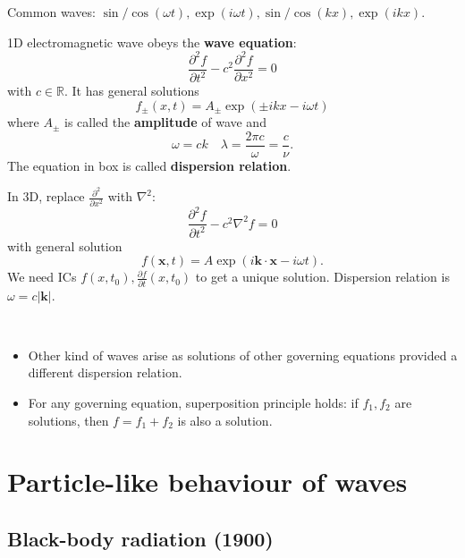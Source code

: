 \documentclass[a4paper]{article}
\begin{document}
\begin{example}
    Common waves: $ \sin/\cos(\omega t) , \exp(i\omega t), \sin/\cos(kx), \exp(ikx) $. 
\end{example}

\begin{example}
    1D electromagnetic wave obeys the \textbf{wave equation}: 
    \begin{equation}\label{eqn:I.1.wave_eqn}
        \frac{\partial^2 f}{\partial t^2} - c^2 \frac{\partial^2 f}{\partial x^2} = 0
    \end{equation}
    with $c\in \mathbb{R}$. It has general solutions 
    \[
        f_{\pm}(x,t) = A_{\pm}\exp(\pm ikx-i\omega t)
    \]
    where $A_{\pm}$ is called the \textbf{amplitude} of wave and
    \[
        \boxed{\omega=ck}\quad \lambda = \frac{2\pi c}{\omega} = \frac{c}{\nu}. 
    \]
    The equation in box is called \textbf{dispersion relation}. 

    In 3D, replace $\frac{\partial^2 }{\partial x^2} $ with $ \nabla^2 $:
    \begin{equation}\label{eqn:I.1.wave_eqn_3d}
        \frac{\partial^2 f}{\partial t^2} - c^2 \nabla^2 f = 0
    \end{equation}
    with general solution 
    \[
        f(\mathbf{x},t) = A \exp(i \mathbf{k}\cdot \mathbf{x} - i \omega t).
    \]
    We need ICs $ f(x,t_0),\frac{\partial f}{\partial t}(x,t_0)  $ to get a unique solution. Dispersion relation is $ \omega = c|\mathbf{k}| $. 
\end{example}

\begin{note}\
    \begin{itemize}
        \item Other kind of waves arise as solutions of other governing equations provided a different dispersion relation. 
        \item For any governing equation, superposition principle holds: if $ f_1,f_2 $ are solutions, then $f=f_1+f_2$ is also a solution. 
    \end{itemize}
\end{note}

\section{Particle-like behaviour of waves}
\subsection{Black-body radiation (1900)}
\end{document}

